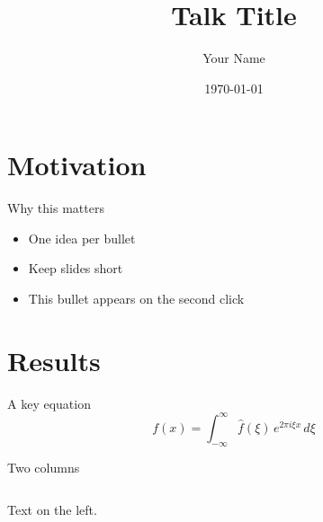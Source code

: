 \documentclass[aspectratio=169]{beamer}
\title{Talk Title}
\author{Your Name}
\institute{Your Institution}
\date{\today}
\begin{document}
\begin{frame}
  \titlepage
\end{frame}

\section{Motivation}

\begin{frame}{Why this matters}
  \begin{itemize}
    \item One idea per bullet
    \item Keep slides short
    \item<2-> This bullet appears on the second click
  \end{itemize}
\end{frame}

\section{Results}

\begin{frame}{A key equation}
  \begin{equation*}
    f(x) = \int_{-\infty}^{\infty} \hat{f}(\xi)\, e^{2\pi i \xi x}\, d\xi
  \end{equation*}
\end{frame}

\begin{frame}{Two columns}
  \begin{columns}
    Text on the left.
  \end{columns}
\end{frame}
\end{document}
